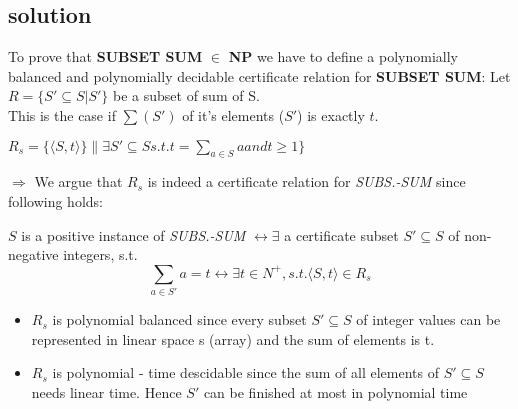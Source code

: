 \subsection{solution}

To prove that \textbf{SUBSET SUM} $\in$ \textbf{NP} we have to define a polynomially balanced and 
polynomially decidable certificate relation for \textbf{SUBSET SUM}:
\newline
\newline
Let $R=\{S'\subseteq S | S'\}$ be a subset of sum of S. \\
This is the case if $\sum (S')$ of it's elements ($S'$) is exactly $t$.
\newline\newline


$R_s = \{\langle S,t\rangle\} \| \exists S' \subseteq S s.t. t = \sum_{a \in S}a and t \geq 1\}$

\noindent $\Rightarrow$ 
We argue that $R_s$ is indeed a certificate relation for \textit{SUBS.-SUM} 
since following holds:

$S$ is a positive instance of \textit{SUBS.-SUM} $\leftrightarrow \exists$ a certificate
subset $S' \subseteq S$ of non-negative integers, s.t.
$$\sum_{a \in S'}a = t \leftrightarrow \exists t \in N^{+}, s.t. \langle S,t\rangle\in R_s$$

\begin{itemize}
 \item $R_s$ is polynomial balanced since every subset $S' \subseteq S$ of
integer values can be represented in linear space s (array) and
the sum of elements is t.
 \item $R_s$ is polynomial - time descidable since the sum of all elements 
of $S' \subseteq S$ needs linear time. Hence $S'$ can be finished at most in 
polynomial time
\end{itemize}
